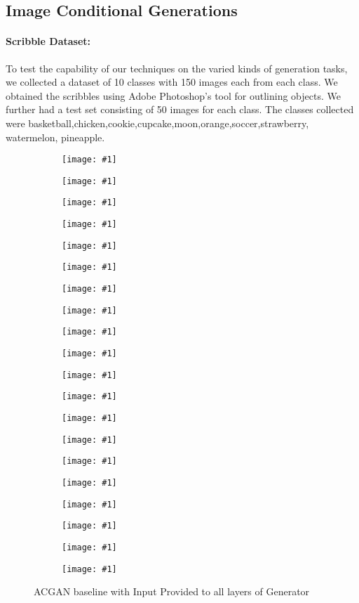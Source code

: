 \subsection{Image Conditional Generations}

\paragraph{Scribble Dataset:}
To test the capability of our techniques on the varied kinds of generation tasks, we collected a dataset of 10 classes with 150 images each from each class. We obtained the scribbles using Adobe Photoshop's tool for outlining objects. We further had a test set consisting of 50 images for each class. The classes collected were basketball,chicken,cookie,cupcake,moon,orange,soccer,strawberry, watermelon, pineapple. 

\newcommand{\addSubFigTenth}[3]{\begin{subfigure}[t]{.16\linewidth}
   \texttt{[image: \#1]}
   \caption{#2}\label{#3}\end{subfigure}
}

\begin{figure*}%
    \centering
    \addSubFigTenth{acgan_baseline_all/basketball_11_real_A}{}{fig:basketball_scribble} 
    \addSubFigTenth{acgan_baseline_all/chicken_2_real_A}{}{fig:chicken_scribble} 
    \addSubFigTenth{acgan_baseline_all/cookie_13_real_A}{}{fig:cookie_scribble}
    \addSubFigTenth{acgan_baseline_all/cupcake_27_real_A}{}{fig:cupcake_scribble}
    \addSubFigTenth{acgan_baseline_all/moon_15_real_A}{}{fig:moon_scribble}
    \addSubFigTenth{acgan_baseline_all/basketball_11_fake_B}{}{fig:basketball_img} 
    \addSubFigTenth{acgan_baseline_all/chicken_2_fake_B}{}{fig:chicken_img} 
    \addSubFigTenth{acgan_baseline_all/cookie_13_fake_B}{}{fig:cookie_img}
    \addSubFigTenth{acgan_baseline_all/cupcake_27_fake_B}{}{fig:cupcake_img}
    \addSubFigTenth{acgan_baseline_all/moon_15_fake_B}{}{fig:moon_img}
    \addSubFigTenth{acgan_baseline_all/orange_17_real_A}{}{fig:orange_scribble} 
    \addSubFigTenth{acgan_baseline_all/pineapple_2_real_A}{}{fig:pineapple_scribble} 
    \addSubFigTenth{acgan_baseline_all/soccer_18_real_A}{}{fig:soccer_scribble}
    \addSubFigTenth{acgan_baseline_all/strawberry_1_real_A}{}{fig:strawberry_scribble}
    \addSubFigTenth{acgan_baseline_all/watermelon_17_real_A}{}{fig:watermelon_scribble}
    \addSubFigTenth{acgan_baseline_all/orange_17_fake_B}{}{fig:orange_img} 
    \addSubFigTenth{acgan_baseline_all/pineapple_2_fake_B}{}{fig:pineapple_img} 
    \addSubFigTenth{acgan_baseline_all/soccer_18_fake_B}{}{fig:soccer_img}
    \addSubFigTenth{acgan_baseline_all/strawberry_1_fake_B}{}{fig:strawberry_img}
    \addSubFigTenth{acgan_baseline_all/watermelon_17_fake_B}{}{fig:watermelon_img}
    \caption{ACGAN baseline with Input Provided to all layers of Generator}
    \label{fig:scribble_pix2pix}
    \vspace{-3mm}
\end{figure*}


